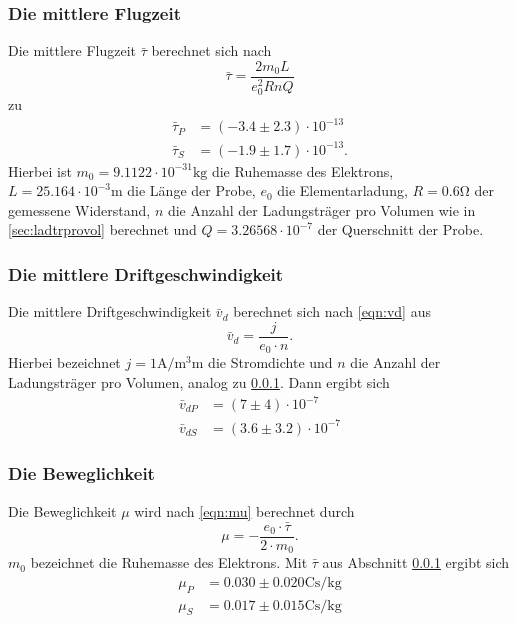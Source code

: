     \subsubsection{Die mittlere Flugzeit}
    \label{sec:mitflugz}
      Die mittlere Flugzeit $\bar{\tau}$ berechnet sich nach
      \begin{equation*}
        \bar{\tau} = \frac{2m_{0}L}{e_{0}^{2}RnQ}
      \end{equation*}
      zu
      \begin{align*}
        \bar{\tau}_{P} & = (-3.4 \pm 2.3) \cdot 10^{-13} \\
        \bar{\tau}_{S} & = (-1.9 \pm 1.7) \cdot 10^{-13}.
      \end{align*}
      Hierbei ist $m_{0} = 9.1122 \cdot 10^{-31} \si{\kilo\gram}$ die Ruhemasse des Elektrons, $L = 25.164 \cdot 10^{-3} \si{\meter}$ die Länge der Probe,
      $e_{0}$ die Elementarladung, $R = 0.6 \si{\ohm}$ der gemessene Widerstand, $n$ die Anzahl der Ladungsträger pro Volumen wie in \ref{sec:ladtrprovol} berechnet
      und $Q = 3.26568 \cdot 10^{-7}$ der Querschnitt der Probe.
    \subsubsection{Die mittlere Driftgeschwindigkeit}
      Die mittlere Driftgeschwindigkeit $\bar{v}_d$ berechnet sich nach \ref{eqn:vd} aus
      \begin{equation}
        \bar{v}_d = \frac{j}{e_{0} \cdot n}.
      \end{equation}
      Hierbei bezeichnet $j = 1 \si{\ampere\per\cubic\milli\meter}$ die Stromdichte und $n$ die Anzahl der Ladungsträger pro Volumen, analog zu \ref{sec:mitflugz}.
      Dann ergibt sich
      \begin{align*}
        \bar{v}_{dP} & = (7 \pm 4) \cdot 10^{-7} \\
        \bar{v}_{dS} & = (3.6 \pm 3.2) \cdot 10^{-7}
      \end{align*}
    \subsubsection{Die Beweglichkeit}
      Die Beweglichkeit $\mu$ wird nach \ref{eqn:mu} berechnet durch
      \begin{equation}
        \mu = -\frac{e_{0} \cdot \bar{\tau}}{2 \cdot m_{0}}.
      \end{equation}
      $m_{0}$ bezeichnet die Ruhemasse des Elektrons. Mit $\bar{\tau}$ aus Abschnitt \ref{sec:mitflugz} ergibt sich
      \begin{align*}
        \mu_{P} & = 0.030 \pm 0.020 \si{\coulomb\second\per\kilo\gram}\\
        \mu_{S} & = 0.017 \pm 0.015 \si{\coulomb\second\per\kilo\gram}
      \end{align*}
